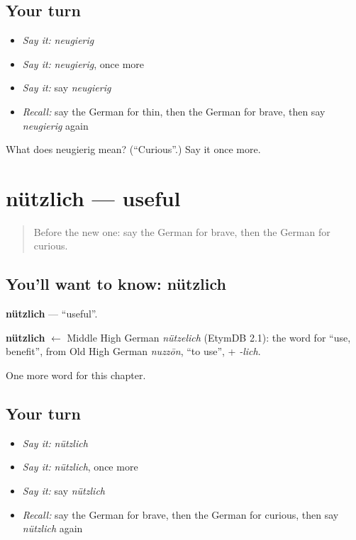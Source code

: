 \subsection*{Your turn}
\begin{itemize}
\raggedright
  \item \emph{Say it:} \emph{neugierig}
  \item \emph{Say it:} \emph{neugierig}, once more
  \item \emph{Say it:} say \emph{neugierig}
  \item \emph{Recall:} say the German for thin, then the German for brave, then say \emph{neugierig} again
\end{itemize}

\begin{tcolorbox}[breakable,colback=teal!4,colframe=teal!35!black,title={Before you move on}]
What does neugierig mean? (\textquotedblleft{}Curious\textquotedblright{}.) Say it once more.
\end{tcolorbox}
\section[nützlich]{nützlich — useful}

\label{lesson:GE-C219-nuetzlich}



\begin{quote}
Before the new one: say the German for brave, then the German for curious.
\end{quote}

\subsection*{You'll want to know: nützlich}
\textbf{nützlich} — \textquotedblleft{}useful\textquotedblright{}.

\begin{cousinweb}
\textbf{nützlich} $\leftarrow$ Middle High German \emph{nützelich} (EtymDB 2.1): the word for \textquotedblleft{}use, benefit\textquotedblright{}, from Old High German \emph{nuzzōn}, \textquotedblleft{}to use\textquotedblright{}, + \emph{-lich}.
\end{cousinweb}

\begin{grammarlens}[title={What you've built}]
One more word for this chapter.
\end{grammarlens}

\subsection*{Your turn}
\begin{itemize}
\raggedright
  \item \emph{Say it:} \emph{nützlich}
  \item \emph{Say it:} \emph{nützlich}, once more
  \item \emph{Say it:} say \emph{nützlich}
  \item \emph{Recall:} say the German for brave, then the German for curious, then say \emph{nützlich} again
\end{itemize}

